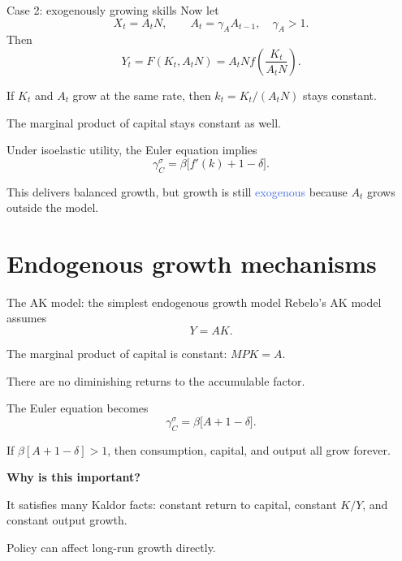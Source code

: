 \documentclass[aspectratio=169,xcolor=dvipsnames]{beamer}
\let\tempone\itemize
\let\temptwo\enditemize
\renewenvironment{itemize}{\tempone\addtolength{\itemsep}{\fill}}{\temptwo}
\providecommand{\blue}[1]{\textcolor{RoyalBlue}{#1}}
\begin{document}
\begin{frame}{Case 2: exogenously growing skills}
\small
Now let
\[
X_t=A_tN, \qquad A_t=\gamma_A A_{t-1}, \quad \gamma_A>1.
\]
Then
\[
Y_t = F(K_t,A_tN)=A_tN f\!\left(\frac{K_t}{A_tN}\right).
\]

\begin{itemize}
    \item If $K_t$ and $A_t$ grow at the same rate, then $k_t=K_t/(A_tN)$ stays constant.
    \item The marginal product of capital stays constant as well.
    \item Under isoelastic utility, the Euler equation implies
    \[
    \gamma_C^{\sigma} = \beta\big[f'(k)+1-\delta\big].
    \]
\end{itemize}

\vspace{0.4em}
This delivers balanced growth, but growth is still \blue{exogenous} because $A_t$ grows outside the model.
\end{frame}

\section{Endogenous growth mechanisms}

\begin{frame}{The AK model: the simplest endogenous growth model}
\small
Rebelo's AK model assumes
\[
Y = AK.
\]

\begin{itemize}
    \item The marginal product of capital is constant: \(MPK=A\).
    \item There are no diminishing returns to the accumulable factor.
    \item The Euler equation becomes
    \[
    \gamma_C^{\sigma}=\beta\big[A+1-\delta\big].
    \]
    \item If \(\beta[A+1-\delta]>1\), then consumption, capital, and output all grow forever.
\end{itemize}

\vspace{0.4em}
\textbf{Why is this important?}
\begin{itemize}
    \item It satisfies many Kaldor facts: constant return to capital, constant $K/Y$, and constant output growth.
    \item Policy can affect long-run growth directly.
\end{itemize}
\end{frame}
\end{document}
